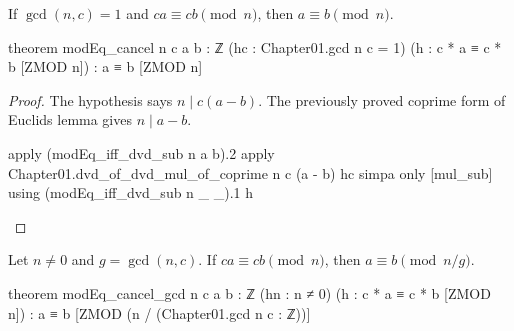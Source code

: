 \begin{theorem}
  \label{ent:thm:modeq-cancel}
  If $\gcd(n,c)=1$ and $ca\equiv cb\pmod n$, then $a\equiv b\pmod n$.

  \begin{lean}
    theorem modEq_cancel {n c a b : ℤ} (hc : Chapter01.gcd n c = 1)
        (h : c * a ≡ c * b [ZMOD n]) : a ≡ b [ZMOD n]
  \end{lean}
\end{theorem}

\begin{proof}
  The hypothesis says $n\mid c(a-b)$.
  The previously proved coprime form of Euclid\textquotesingle s lemma gives $n\mid a-b$.

  \begin{lean}
    apply (modEq_iff_dvd_sub n a b).2
    apply Chapter01.dvd_of_dvd_mul_of_coprime n c (a - b) hc
    simpa only [mul_sub] using (modEq_iff_dvd_sub n _ _).1 h
  \end{lean}
\end{proof}

\begin{theorem}
  \label{ent:thm:modeq-cancel-gcd}
  Let $n\ne0$ and $g=\gcd(n,c)$.
  If $ca\equiv cb\pmod n$, then $a\equiv b\pmod{n/g}$.

  \begin{lean}
    theorem modEq_cancel_gcd {n c a b : ℤ} (hn : n ≠ 0)
        (h : c * a ≡ c * b [ZMOD n]) :
        a ≡ b [ZMOD (n / (Chapter01.gcd n c : ℤ))]
  \end{lean}
\end{theorem}

